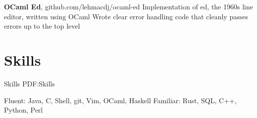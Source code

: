 \documentclass[letterpaper,10pt,oneside]{simpleresume}
\begin{document}
\begin{minipage}[t][0pt]{\linewidth}
\begin{body}
\textbf{OCaml Ed}, github.com/lehmacdj/ocaml-ed
\BulletItem%
Implementation of ed, the 1960s line editor, written using OCaml
\BulletItem%
Wrote clear error handling code that cleanly passes errors up to the top level
\GapNoBreak%



\section%
{Skills}
{Skills}
{PDF:Skills}

Fluent: Java, C, Shell, git, Vim, OCaml, Haskell
\GapNoBreak%
Familiar: Rust, SQL, C++, Python, Perl

\end{body}
\end{minipage}
\end{document}
